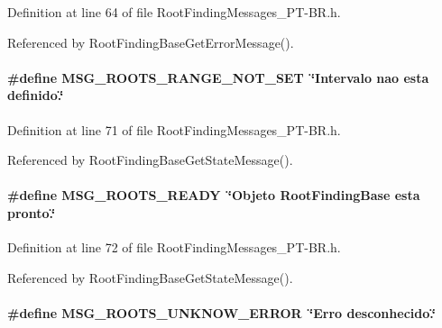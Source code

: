 Definition at line 64 of file RootFindingMessages\_\-PT-BR.h.

Referenced by RootFindingBaseGetErrorMessage().\hypertarget{group____messages_g351b0a132b97b932e9152973ca84ab0f}{
\paragraph[MSG\_\-ROOTS\_\-RANGE\_\-NOT\_\-SET]{\setlength{\rightskip}{0pt plus 5cm}\#define MSG\_\-ROOTS\_\-RANGE\_\-NOT\_\-SET~\char`\"{}Intervalo nao esta definido.\char`\"{}}\hfill}
\label{group____messages_g351b0a132b97b932e9152973ca84ab0f}




Definition at line 71 of file RootFindingMessages\_\-PT-BR.h.

Referenced by RootFindingBaseGetStateMessage().\hypertarget{group____messages_gf99c4ab1f930201e0632f3d2e3267438}{
\paragraph[MSG\_\-ROOTS\_\-READY]{\setlength{\rightskip}{0pt plus 5cm}\#define MSG\_\-ROOTS\_\-READY~\char`\"{}Objeto {\bf RootFindingBase} esta pronto.\char`\"{}}\hfill}
\label{group____messages_gf99c4ab1f930201e0632f3d2e3267438}




Definition at line 72 of file RootFindingMessages\_\-PT-BR.h.

Referenced by RootFindingBaseGetStateMessage().\hypertarget{group____messages_g9d5756daf9e0e99c65a2b72531a0b765}{
\paragraph[MSG\_\-ROOTS\_\-UNKNOW\_\-ERROR]{\setlength{\rightskip}{0pt plus 5cm}\#define MSG\_\-ROOTS\_\-UNKNOW\_\-ERROR~\char`\"{}Erro desconhecido.\char`\"{}}\hfill}
\label{group____messages_g9d5756daf9e0e99c65a2b72531a0b765}




